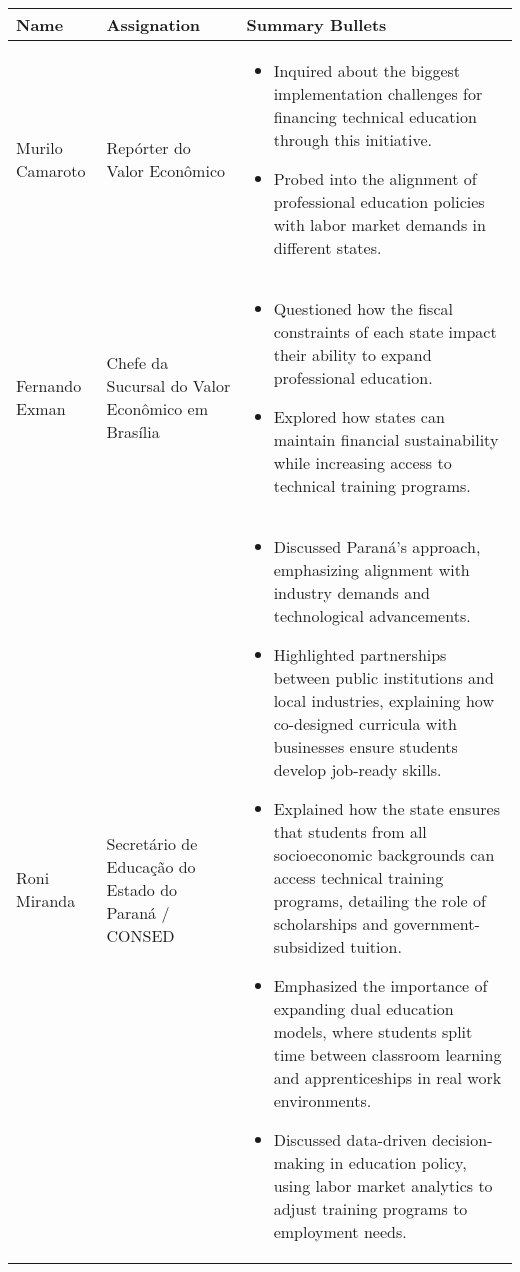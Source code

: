 \documentclass[a4paper,10pt]{article}
\begin{document}
\begin{table}[htbp!]
	\centering
	\renewcommand{\arraystretch}{1.2}
	\begin{tabular}{|p{1in}|p{1in}|p{4.6in}|}
		\hline
		Name & Assignation & Summary Bullets \\
		\hline
		Murilo Camaroto & Repórter do Valor Econômico & \begin{itemize}
			\item Inquired about the biggest implementation challenges for financing technical education through this initiative.
			\item Probed into the alignment of professional education policies with labor market demands in different states.
		\end{itemize}\\
		\hline
		Fernando Exman & Chefe da Sucursal do Valor Econômico em Brasília & \begin{itemize}
			\item Questioned how the fiscal constraints of each state impact their ability to expand professional education.
			\item Explored how states can maintain financial sustainability while increasing access to technical training programs.
		\end{itemize}\\
		\hline
		Roni Miranda & Secretário de Educação do Estado do Paraná / CONSED & \begin{itemize}
			\item Discussed Paraná’s approach, emphasizing alignment with industry demands and technological advancements.
			\item Highlighted partnerships between public institutions and local industries, explaining how co-designed curricula with businesses ensure students develop job-ready skills.
			\item Explained how the state ensures that students from all socioeconomic backgrounds can access technical training programs, detailing the role of scholarships and government-subsidized tuition.
			\item Emphasized the importance of expanding dual education models, where students split time between classroom learning and apprenticeships in real work environments.
			\item Discussed data-driven decision-making in education policy, using labor market analytics to adjust training programs to employment needs.
		\end{itemize}\\

\end{tabular}
\end{table}
\end{document}
